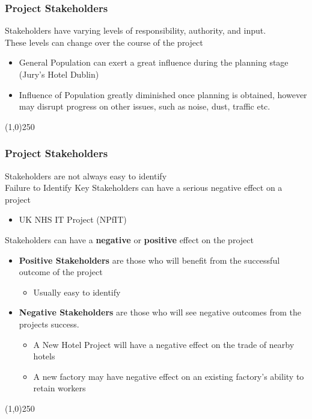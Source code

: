 \begin{frame}
\frametitle{Project Stakeholders}
Stakeholders have varying levels of responsibility, authority, and input.\\
These levels can change over the course of the project\\
\begin{itemize}
	\item General Population can exert a great influence during the planning stage (Jury's Hotel Dublin)
	\item Influence of Population greatly diminished once planning is obtained, however may disrupt progress on other issues, such as noise, dust, traffic etc.
\end{itemize}
\end{frame}
\begin{center}\line(1,0){250}\end{center}



\begin{frame}
\frametitle{Project Stakeholders}
Stakeholders are not always easy to identify\\
Failure to Identify Key Stakeholders can have a serious negative effect on a project\\
\begin{itemize}
	\item UK NHS IT Project (NPfIT)
\end{itemize}
Stakeholders can have a \textbf{negative} or \textbf{positive} effect on the project\\
\begin{itemize}
	\item \textbf{Positive Stakeholders} are those who will benefit from the successful outcome of the project
	\begin{itemize}
		\item Usually easy to identify
	\end{itemize}
	\item \textbf{Negative Stakeholders} are those who will see negative outcomes from the projects success.
	\begin{itemize}
		\item A New Hotel Project will have a negative effect on the trade of nearby hotels
		\item A new factory may have negative effect on an existing factory's ability to retain workers
	\end{itemize}
\end{itemize}
\end{frame}
\begin{center}\line(1,0){250}\end{center}



